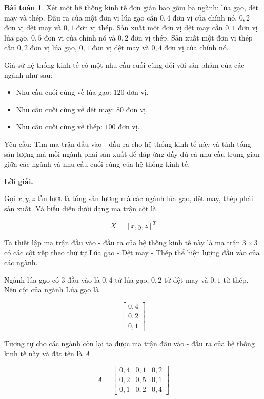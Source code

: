 \documentclass[12pt,a4paper,oneside]{book}
\theoremstyle{theorem}
\theoremstyle{definition}
\newtheorem{bt}[theorem2]{Bài toán}
\begin{document}
  \begin{bt}
       Xét một hệ thống kinh tế đơn giản bao gồm ba ngành:
lúa gạo, dệt may và thép. Đầu ra của một đơn vị lúa gạo cần \(0,4\) đơn vị của
chính nó, \(0,2\) đơn vị dệt may và \(0,1\) đơn vị thép. Sản xuất một đơn vị dệt
may cần \(0,1\) đơn vị lúa gạo, \(0,5\) đơn vị của chính nó và \(0,2\) đơn vị thép.
Sản xuất một đơn vị thép cần \(0,2\) đơn vị lúa gạo, \(0,1\) đơn vị dệt may và
\(0,4\) đơn vị của chính nó.

\medskip

Giả sử hệ thống kinh tế có một nhu cầu cuối cùng đối với sản phẩm của
các ngành như sau:

\begin{itemize}
    \item Nhu cầu cuối cùng về lúa gạo: \(120\) đơn vị.
    \item Nhu cầu cuối cùng về dệt may: \(80\) đơn vị.
    \item Nhu cầu cuối cùng về thép: \(100\) đơn vị.
\end{itemize}

Yêu cầu: Tìm ma trận đầu vào - đầu ra cho hệ thống kinh tế này và tính
tổng sản lượng mà mỗi ngành phải sản xuất để đáp ứng đầy đủ cả nhu cầu
trung gian giữa các ngành và nhu cầu cuối cùng của hệ thống kinh tế.

\bigskip

\textbf{Lời giải.}

\medskip

Gọi \(x,y,z\) lần lượt là tổng sản lượng mà các ngành lúa gạo, dệt may,
thép phải sản xuất. Và biểu diễn dưới dạng ma trận cột là

\[
X=[x,y,z]^T
\]

Ta thiết lập ma trận đầu vào - đầu ra của hệ thống kinh tế này là ma trận
\(3\times3\) có các cột xếp theo thứ tự Lúa gạo - Dệt may - Thép thể hiện lượng
đầu vào của các ngành.

\medskip

Ngành lúa gạo có 3 đầu vào là \(0,4\) từ lúa gạo, \(0,2\) từ dệt may và
\(0,1\) từ thép. Nên cột của ngành Lúa gạo là

\[
\begin{bmatrix}
0,4\\
0,2\\
0,1
\end{bmatrix}
\]

Tương tự cho các ngành còn lại ta được ma trận đầu vào - đầu ra của hệ
thống kinh tế này và đặt tên là \(A\)

\[
A=
\begin{bmatrix}
0,4 & 0,1 & 0,2\\
0,2 & 0,5 & 0,1\\
0,1 & 0,2 & 0,4
\end{bmatrix}
\]


\end{bt}
\end{document}
